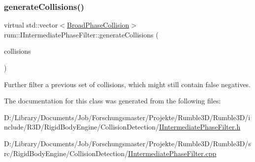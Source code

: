 \subsubsection{\texorpdfstring{generate\+Collisions()}{generateCollisions()}}
{\footnotesize\ttfamily virtual std\+::vector$<$\mbox{\hyperlink{structrum_1_1_broad_phase_collision}{Broad\+Phase\+Collision}}$>$ rum\+::\+I\+Intermediate\+Phase\+Filter\+::generate\+Collisions (\begin{DoxyParamCaption}\item[{const std\+::vector$<$ \mbox{\hyperlink{structrum_1_1_broad_phase_collision}{Broad\+Phase\+Collision}} $>$ \&}]{collisions }\end{DoxyParamCaption})\hspace{0.3cm}{\ttfamily [pure virtual]}}

Further filter a previous set of collisions, which might still contain false negatives. 

The documentation for this class was generated from the following files\+:\begin{DoxyCompactItemize}
\item 
D\+:/\+Library/\+Documents/\+Job/\+Forschungsmaster/\+Projekte/\+Rumble3\+D/\+Rumble3\+D/include/\+R3\+D/\+Rigid\+Body\+Engine/\+Collision\+Detection/\mbox{\hyperlink{_i_intermediate_phase_filter_8h}{I\+Intermediate\+Phase\+Filter.\+h}}\item 
D\+:/\+Library/\+Documents/\+Job/\+Forschungsmaster/\+Projekte/\+Rumble3\+D/\+Rumble3\+D/src/\+Rigid\+Body\+Engine/\+Collision\+Detection/\mbox{\hyperlink{_i_intermediate_phase_filter_8cpp}{I\+Intermediate\+Phase\+Filter.\+cpp}}\end{DoxyCompactItemize}
